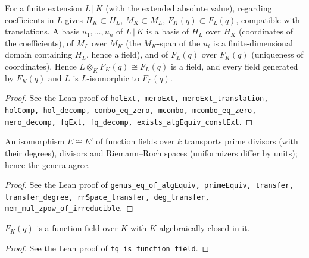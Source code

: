 \begin{proposition}
\label{prop:fq-const-ext}
\leanok
For a finite extension $L\,|\,K$ (with the extended absolute value), regarding coefficients in $L$ gives $H_K\subset H_L$, $M_K\subset M_L$, $F_K(q)\subset F_L(q)$, compatible with translations. A basis $u_1,\dots,u_n$ of $L\,|\,K$ is a basis of $H_L$ over $H_K$ (coordinates of the coefficients), of $M_L$ over $M_K$ (the $M_K$-span of the $u_i$ is a finite-dimensional domain containing $H_L$, hence a field), and of $F_L(q)$ over $F_K(q)$ (uniqueness of coordinates). Hence $L\otimes_KF_K(q)\cong F_L(q)$ is a field, and every field generated by $F_K(q)$ and $L$ is $L$-isomorphic to $F_L(q)$.
\end{proposition}
\begin{proof}
\leanok
See the Lean proof of \texttt{holExt, meroExt, meroExt\_translation, holComp, hol\_decomp, combo\_eq\_zero, mcombo, mcombo\_eq\_zero, mero\_decomp, fqExt, fq\_decomp, exists\_algEquiv\_constExt}.
\end{proof}

\begin{lemma}
\label{lem:genus-iso}
\leanok
An isomorphism $E\cong E'$ of function fields over $k$ transports prime divisors (with their degrees), divisors and Riemann--Roch spaces (uniformizers differ by units); hence the genera agree.
\end{lemma}
\begin{proof}
\leanok
See the Lean proof of \texttt{genus\_eq\_of\_algEquiv, primeEquiv, transfer, transfer\_degree, rrSpace\_transfer, deg\_transfer, mem\_mul\_zpow\_of\_irreducible}.
\end{proof}

\begin{theorem}
\label{thm:fq-function-field}
\leanok
$F_K(q)$ is a function field over $K$ with $K$ algebraically closed in it.
\end{theorem}
\begin{proof}
\leanok
See the Lean proof of \texttt{fq\_is\_function\_field}.
\end{proof}

